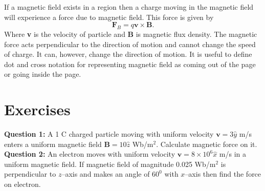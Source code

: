 \documentclass[12pt,a4paper]{article}
\begin{document}
If a magnetic field exists in a region then a charge moving in the magnetic field will experience a force due to magnetic field. This force is given by
\begin{equation}
\textbf{F}_B=q\textbf{v}\times\textbf{B}.
\end{equation}
Where \textbf{v} is the velocity of particle and \textbf{B} is magnetic flux density. The magnetic force acts perpendicular to the direction of motion and cannot change the speed of charge. It can, however, change the direction of motion. It is useful to define dot and cross notation for representing magnetic field as coming out of the page or going inside the page.
\section{Exercises}
\noindent\textbf{Question 1:} A 1 C charged particle moving with uniform velocity $\textbf{v}=3\hat y$ m/s enters a uniform magnetic field $\textbf{B}=10\hat z$ Wb/m$^2$. Calculate magnetic force on it.\\[0.2cm]
\noindent\textbf{Question 2:} An electron moves with uniform velocity $\textbf{v}=8\times 10^6\hat x$ m/s in a uniform magnetic field. If magnetic field of magnitude 0.025 Wb/m$^2$ is perpendicular to $z$--axis and makes an angle of $60^0$ with $x$--axis then find the force on electron.
%
%
\end{document}
